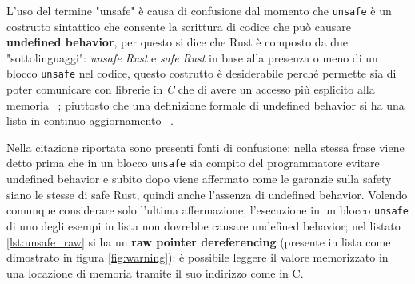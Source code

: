 \documentclass[Lau,binding=0.6cm]{sapthesis}
\begin{document}
\vspace{5mm}

\begin{Parallel}{0.48\textwidth}{0.48\textwidth}
    
    \ParallelPar
\end{Parallel}

\vspace{5mm}

L'uso del termine "unsafe" è causa di confusione dal momento che \colorbox{backcolour}{\texttt{unsafe}} è un costrutto sintattico che consente la scrittura di codice che può causare \textbf{undefined behavior}, per questo si dice che Rust è composto da due "sottolinguaggi": \textit{unsafe Rust} e \textit{safe Rust} in base alla presenza o meno di un blocco \colorbox{backcolour}{\texttt{unsafe}} nel codice, questo costrutto è desiderabile perché permette sia di poter comunicare con librerie in \textit{C} che di avere un accesso più esplicito alla memoria ~\cite[1.2]{rust:rustonomicon}; piuttosto che una definizione formale di undefined behavior si ha una lista in continuo aggiornamento ~\cite[14.3]{rust:reference}.

Nella citazione riportata sono presenti fonti di confusione: nella stessa frase viene detto prima che in un blocco \colorbox{backcolour}{\texttt{unsafe}} sia compito del programmatore evitare undefined behavior e subito dopo viene affermato come le garanzie sulla safety siano le stesse di safe Rust, quindi anche l'assenza di undefined behavior. Volendo comunque considerare solo l'ultima affermazione, l'esecuzione in un blocco \colorbox{backcolour}{\texttt{unsafe}} di uno degli esempi in lista non dovrebbe causare undefined behavior; nel listato \ref{lst:unsafe_raw} si ha un \textbf{raw pointer dereferencing} (presente in lista come dimostrato in figura \ref{fig:warning}): è possibile leggere il valore memorizzato in una locazione di memoria tramite il suo indirizzo come in C.
\end{document}
